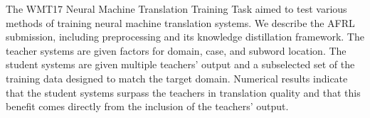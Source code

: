 The WMT17 Neural Machine Translation Training Task aimed to test various methods of training neural machine translation systems. We describe the AFRL submission, including preprocessing and its knowledge distillation framework. The teacher systems are given factors for domain, case, and subword location. The student systems are given multiple teachers' output and a subselected set of the training data designed to match the target domain. Numerical results indicate that the student systems surpass the teachers in translation quality and that this benefit comes directly from the inclusion of the teachers' output.
